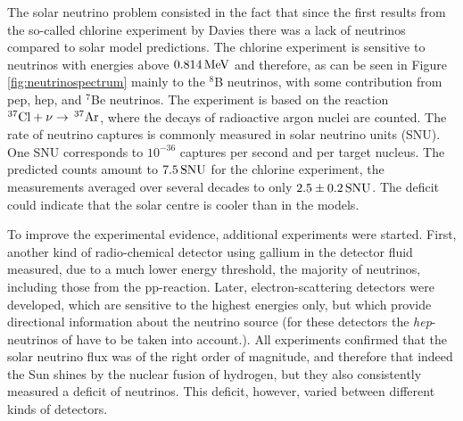 \documentclass[a4paper,10pt]{article}
\begin{document}
{\noindent}The solar neutrino problem consisted in the fact that since the first results from the so-called chlorine experiment by Davies there was a lack of neutrinos compared to solar model predictions. The chlorine experiment is sensitive to neutrinos with energies above $0.814\,{\rm MeV}$ and therefore, as can be seen in Figure \ref{fig:neutrinospectrum} mainly to the $^8$B neutrinos, with some contribution from pep, hep, and $^7$Be neutrinos. The experiment is based on the reaction $^{37}{\rm Cl}+\nu\rightarrow\,^{37}{\rm Ar}$, where the decays of radioactive argon nuclei are counted. The rate of neutrino captures is commonly measured in solar neutrino units (SNU). One SNU corresponds to $10^{-36}$ captures per second and per target nucleus. The predicted counts amount to $7.5\,{\rm SNU}$ for the chlorine experiment, the measurements averaged over several decades to only $2.5\pm0.2\,{\rm SNU}$. The deficit could indicate that the solar centre is cooler than in the models.

{\noindent}To improve the experimental evidence, additional experiments were started. First, another kind of radio-chemical detector using gallium in the detector fluid measured, due to a much lower energy threshold, the majority of neutrinos, including those from the pp-reaction. Later, electron-scattering detectors were developed, which are sensitive to the highest energies only, but which provide directional information about the neutrino source (for these detectors the \textit{hep}-neutrinos of have to be taken into account.). All experiments confirmed that the solar neutrino flux was of the right order of magnitude, and therefore that indeed the Sun shines by the nuclear fusion of hydrogen, but they also consistently measured a deficit of neutrinos. This deficit, however, varied between different kinds of detectors.
\end{document}
